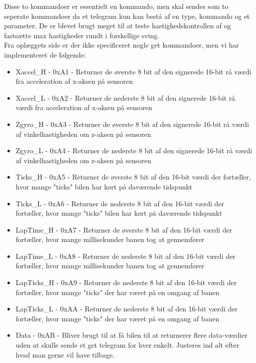 Disse to kommandoer er essentielt en kommando, men skal sendes som to seperate kommandoer da et telegram kun kan bestå af en type, kommando og et parameter. De er blevet brugt meget til at teste hastighedskontrollen af og fastsætte max hastigheder rundt i forskellige sving.\\

Fra oplæggets side er der ikke specificeret nogle get kommandoer, men vi har implementeret de følgende:
\begin{itemize}
	\item Xaccel\_H - 0xA1 - Returner de øverste 8 bit af den signerede 16-bit rå værdi fra acceleration af x-aksen på sensoren
	\item Xaccel\_L - 0xA2 - Returner de nederste 8 bit af den signerede 16-bit rå værdi fra acceleration af x-aksen på sensoren
	\item Zgyro\_H - 0xA3 - Returner de øverste 8 bit af den signerede 16-bit rå værdi af vinkelhastigheden om z-aksen på sensoren
	\item Zgyro\_L - 0xA4 - Returner de nederste 8 bit af den signerede 16-bit rå værdi af vinkelhastigheden om z-aksen på sensoren
	\item Ticks\_H - 0xA5 - Returner de øverste 8 bit af den 16-bit værdi der fortæller, hvor mange "ticks" bilen har kørt på daværende tidspunkt
	\item Ticks\_L - 0xA6 - Returner de nederste 8 bit af den 16-bit værdi der fortæller, hvor mange "ticks" bilen har kørt på daværende tidspunkt
	\item LapTime\_H - 0xA7 - Returner de øverste 8 bit af den 16-bit værdi der fortæller, hvor mange millisekunder banen tog at gennemfører
	\item LapTime\_L - 0xA8 - Returner de nederste 8 bit af den 16-bit værdi der fortæller, hvor mange millisekunder banen tog at gennemfører
	\item LapTicks\_H - 0xA9 - Returner de nederste 8 bit af den 16-bit værdi der fortæller, hvor mange "ticks" der har været på en omgang af banen
	\item LapTicks\_L - 0xAA - Returner de nederste 8 bit af den 16-bit værdi der fortæller, hvor mange "ticks" der har været på en omgang af banen
	\item Data - 0xAB - Bliver brugt til at få bilen til at returnerer flere data-værdier uden at skulle sende et get telegram for hver enkelt. Justeres ind alt efter hvad man gerne vil have tilbage.
	
\end{itemize}

